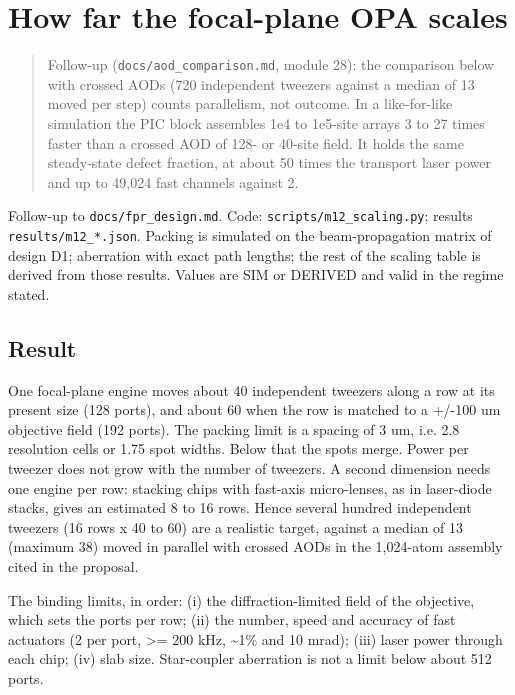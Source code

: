 \hypertarget{how-far-the-focal-plane-opa-scales}{%
\chapter{How far the focal-plane OPA
scales}\label{scaling-how-far-the-focal-plane-opa-scales}}

\begin{quote}
Follow-up (\texttt{docs/aod\_comparison.md}, module 28): the comparison
below with crossed AODs (720 independent tweezers against a median of 13
moved per step) counts parallelism, not outcome. In a like-for-like
simulation the PIC block assembles 1e4 to 1e5-site arrays 3 to 27 times
faster than a crossed AOD of 128- or 40-site field. It holds the same
steady-state defect fraction, at about 50 times the transport laser
power and up to 49,024 fast channels against 2.
\end{quote}

Follow-up to \texttt{docs/fpr\_design.md}. Code:
\texttt{scripts/m12\_scaling.py}; results \texttt{results/m12\_*.json}.
Packing is simulated on the beam-propagation matrix of design D1;
aberration with exact path lengths; the rest of the scaling table is
derived from those results. Values are SIM or DERIVED and valid in the
regime stated.

\hypertarget{1-result}{%
\section{Result}\label{scaling-1-result}}

One focal-plane engine moves about 40 independent tweezers along a row
at its present size (128 ports), and about 60 when the row is matched to
a +/-100 um objective field (192 ports). The packing limit is a spacing
of 3 um, i.e. 2.8 resolution cells or 1.75 spot widths. Below that the
spots merge. Power per tweezer does not grow with the number of
tweezers. A second dimension needs one engine per row: stacking chips
with fast-axis micro-lenses, as in laser-diode stacks, gives an
estimated 8 to 16 rows. Hence several hundred independent tweezers (16
rows x 40 to 60) are a realistic target, against a median of 13 (maximum
38) moved in parallel with crossed AODs in the 1,024-atom assembly cited
in the proposal.

The binding limits, in order: (i) the diffraction-limited field of the
objective, which sets the ports per row; (ii) the number, speed and
accuracy of fast actuators (2 per port, \textgreater= 200 kHz,
\textasciitilde1\% and 10 mrad); (iii) laser power through each chip;
(iv) slab size. Star-coupler aberration is not a limit below about 512
ports.

